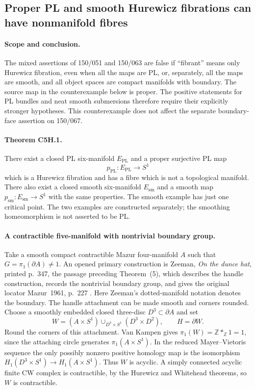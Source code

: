 \subsection{Proper PL and smooth Hurewicz fibrations can have nonmanifold fibres}
\label{sec:C5H}

\paragraph{Scope and conclusion.}
The mixed assertions of 150/051 and 150/063 are false if
``fibrant'' means only Hurewicz fibration, even when all the maps are PL,
or, separately, all the maps are smooth, and all object spaces are compact
manifolds with boundary.  The source map in the counterexample below is
proper.  The positive statements for PL bundles and neat smooth submersions
therefore require their explicitly stronger hypotheses.  This counterexample
does not affect the separate boundary-face assertion on 150/067.

\paragraph{Theorem C5H.1.}
There exist a closed PL six-manifold $E_{\mathrm{PL}}$ and a proper
surjective PL map
\[
 p_{\mathrm{PL}}:E_{\mathrm{PL}}\longrightarrow S^1
\]
which is a Hurewicz fibration and has a fibre which is not a topological
manifold.  There also exist a closed smooth six-manifold $E_{\mathrm{sm}}$
and a smooth map $p_{\mathrm{sm}}:E_{\mathrm{sm}}\to S^1$ with the same
properties.  The smooth example has just one critical point.  The two
examples are constructed separately; the smoothing homeomorphism is not
asserted to be PL.

\paragraph{A contractible five-manifold with nontrivial boundary group.}
Take a smooth compact contractible Mazur four-manifold $A$ such that
$G=\pi_1(\partial A)\ne1$.  An opened primary construction is Zeeman,
\emph{On the dunce hat}, printed p.~347, the passage preceding Theorem~(5),
which describes the handle construction, records the nontrivial boundary
group, and gives the original locator Mazur~1961, p.~227
\cite[p.~347]{C5HZeeman1964}.  Here Zeeman's dotted-manifold notation denotes
the boundary.  The handle attachment can be made smooth and corners rounded.
Choose a smoothly embedded closed three-disc $D^3\subset\partial A$ and set
\[
 W=(A\times S^1)\mathop{\cup}_{D^3\times S^1}(D^3\times D^2),
 \qquad H=\partial W.
 \tag{C5H.1}
\]
Round the corners of this attachment.  Van Kampen gives
$\pi_1(W)=\mathbb Z*_{\mathbb Z}1=1$, since the attaching circle generates
$\pi_1(A\times S^1)$.  In the reduced Mayer--Vietoris sequence the only
possibly nonzero positive homology map is the isomorphism
$H_1(D^3\times S^1)\to H_1(A\times S^1)$.  Thus $W$ is acyclic.
A simply connected acyclic finite CW complex is contractible, by the
Hurewicz and Whitehead theorems, so $W$ is contractible.

